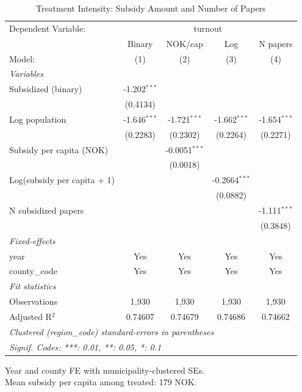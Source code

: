 
\begin{table}[htbp]
   \caption{\label{tab:intensity} Treatment Intensity: Subsidy Amount and Number of Papers}
   \centering
   \begin{tabular}{lcccc}
      \tabularnewline \midrule \midrule
      Dependent Variable: & \multicolumn{4}{c}{turnout}\\
                                  & Binary         & NOK/cap         & Log             & N papers \\   
      Model:                      & (1)            & (2)             & (3)             & (4)\\  
      \midrule
      \emph{Variables}\\
      Subsidized (binary)         & -1.202$^{***}$ &                 &                 &   \\   
                                  & (0.4134)       &                 &                 &   \\   
      Log population              & -1.646$^{***}$ & -1.721$^{***}$  & -1.662$^{***}$  & -1.654$^{***}$\\   
                                  & (0.2283)       & (0.2302)        & (0.2264)        & (0.2271)\\   
      Subsidy per capita (NOK)    &                & -0.0051$^{***}$ &                 &   \\   
                                  &                & (0.0018)        &                 &   \\   
      Log(subsidy per capita + 1) &                &                 & -0.2664$^{***}$ &   \\   
                                  &                &                 & (0.0882)        &   \\   
      N subsidized papers         &                &                 &                 & -1.111$^{***}$\\   
                                  &                &                 &                 & (0.3848)\\   
      \midrule
      \emph{Fixed-effects}\\
      year                        & Yes            & Yes             & Yes             & Yes\\  
      county\_code                & Yes            & Yes             & Yes             & Yes\\  
      \midrule
      \emph{Fit statistics}\\
      Observations                & 1,930          & 1,930           & 1,930           & 1,930\\  
      Adjusted R$^2$              & 0.74607        & 0.74679         & 0.74686         & 0.74662\\  
      \midrule \midrule
      \multicolumn{5}{l}{\emph{Clustered (region\_code) standard-errors in parentheses}}\\
      \multicolumn{5}{l}{\emph{Signif. Codes: ***: 0.01, **: 0.05, *: 0.1}}\\
   \end{tabular}
   
   \par \raggedright 
   Year and county FE with municipality-clustered SEs.\\
   Mean subsidy per capita among treated: 179 NOK.
\end{table}


